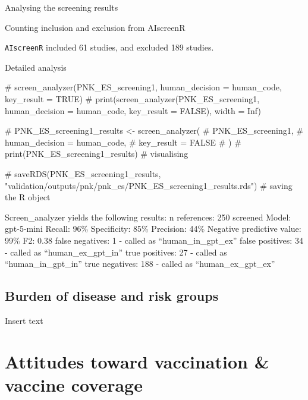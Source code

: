 \documentclass[
  letterpaper,
  DIV=11,
  numbers=noendperiod]{scrartcl}
\newenvironment{Shaded}{\begin{snugshade}}{\end{snugshade}}
\newcommand{\CommentTok}[1]{\textcolor[rgb]{0.37,0.37,0.37}{#1}}
\begin{document}
Analysing the screening results

Counting inclusion and exclusion from AIscreenR

\begin{Shaded}
\end{Shaded}

\texttt{AIscreenR} included 61 studies, and excluded 189 studies.

Detailed analysis

\begin{Shaded}
\begin{Highlighting}[]
\CommentTok{\# screen\_analyzer(PNK\_ES\_screening1, human\_decision = human\_code, key\_result = TRUE)}
\CommentTok{\# print(screen\_analyzer(PNK\_ES\_screening1, human\_decision = human\_code, key\_result = FALSE), width = Inf)}


\CommentTok{\# PNK\_ES\_screening1\_results \textless{}{-} screen\_analyzer(}
\CommentTok{\#     PNK\_ES\_screening1,}
\CommentTok{\#     human\_decision = human\_code,}
\CommentTok{\#     key\_result = FALSE}
\CommentTok{\# )}
\CommentTok{\# print(PNK\_ES\_screening1\_results) \# visualising }

\CommentTok{\# saveRDS(PNK\_ES\_screening1\_results, "validation/outputs/pnk/pnk\_es/PNK\_ES\_screening1\_results.rds") \# saving the R object}
\end{Highlighting}
\end{Shaded}

Screen\_analyzer yields the following results: n references: 250
screened Model: gpt-5-mini Recall: 96\% Specificity: 85\% Precision:
44\% Negative predictive value: 99\% F2: 0.38 false negatives: 1 -
called as ``human\_in\_gpt\_ex'' false positives: 34 - called as
``human\_ex\_gpt\_in'' true positives: 27 - called as
``human\_in\_gpt\_in'' true negatives: 188 - called as
``human\_ex\_gpt\_ex''

\subsection{Burden of disease and risk
groups}\label{burden-of-disease-and-risk-groups-1}

Insert text

\section{Attitudes toward vaccination \& vaccine
coverage}\label{attitudes-toward-vaccination-vaccine-coverage}
\end{document}
